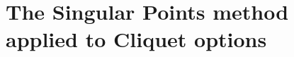 \documentclass[12pt,a4paper]{amsbook}
\begin{document}
\frontmatter






%


%
%
%
%



\mainmatter

% 


% 


%

\chapter[Cliquet options]{The Singular Points method applied to Cliquet options}
\label{cha:sp-cliquet}



\appendix


\backmatter

\printbibliography
\end{document}
